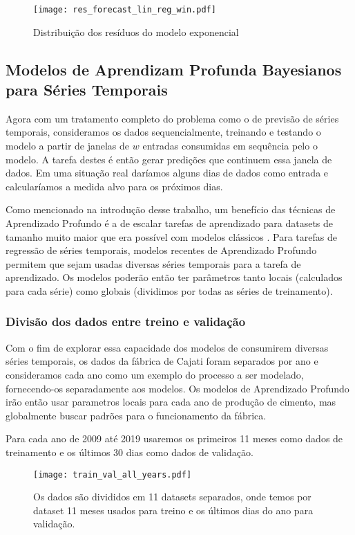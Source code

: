 \begin{figure}[H]
  \label{fig:res_exp}
  \centering
  \texttt{[image: res\_forecast\_lin\_reg\_win.pdf]} \hfill
  \caption{Distribuição dos resíduos do modelo exponencial} 
\end{figure}

\subsection{Modelos de Aprendizam Profunda Bayesianos para Séries Temporais}


Agora com um tratamento completo do problema como o de previsão de séries
temporais, consideramos os dados sequencialmente, treinando e testando o modelo a partir de janelas de $w$
entradas consumidas em sequência pelo o modelo. A tarefa destes é então gerar
predições que continuem essa janela de dados. Em uma situação real daríamos
alguns dias de dados como entrada e calcularíamos a medida alvo para os próximos dias. 


Como mencionado na introdução desse trabalho, um benefício das técnicas de
Aprendizado Profundo é a de escalar tarefas de aprendizado para datasets de
tamanho muito maior que era possível com modelos clássicos \citep{dlbook}.
Para tarefas de regressão de séries temporais, modelos recentes de Aprendizado
Profundo permitem que sejam usadas diversas séries temporais para a tarefa de
aprendizado. Os modelos poderão então ter parâmetros tanto locais (calculados
para cada série) como globais (dividimos por todas as séries de treinamento).

\subsubsection{Divisão dos dados entre treino e validação}

Com o fim de explorar essa capacidade dos modelos de consumirem diversas séries
temporais, os dados da fábrica de Cajati foram separados por ano e consideramos
cada ano como um exemplo do processo a ser modelado, fornecendo-os separadamente
aos modelos. Os modelos de Aprendizado
Profundo irão então usar parametros locais para cada ano de produção de cimento,
mas globalmente buscar padrões para o funcionamento da fábrica. 

Para cada ano de 2009 até 2019 usaremos os primeiros 11 meses como dados de
treinamento e os últimos 30 dias como dados de validação.



\begin{figure}[H]
  \centering
  \texttt{[image: train\_val\_all\_years.pdf]} 
  \caption{Os dados são divididos em 11 datasets separados, onde temos por
    dataset 11 meses usados para treino e os últimos dias do ano para validação.} 
  \label{fig:trainvalallyears}
\end{figure}



